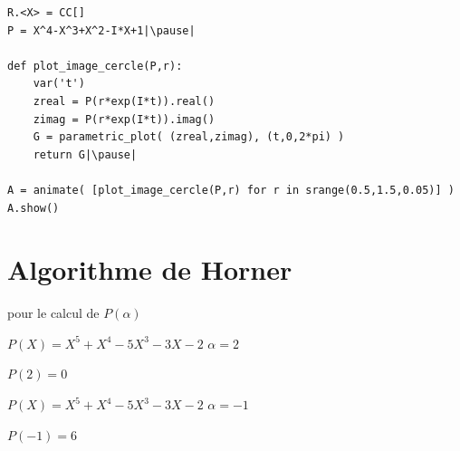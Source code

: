 \begin{frame}[fragile]

\begin{algo}
\begin{lstlisting}
R.<X> = CC[]
P = X^4-X^3+X^2-I*X+1|\pause|

def plot_image_cercle(P,r):
    var('t')
    zreal = P(r*exp(I*t)).real()
    zimag = P(r*exp(I*t)).imag()
    G = parametric_plot( (zreal,zimag), (t,0,2*pi) ) 
    return G|\pause|
    
A = animate( [plot_image_cercle(P,r) for r in srange(0.5,1.5,0.05)] )
A.show()

\end{lstlisting}
\end{algo}
\end{frame}



\section{Algorithme de Horner}

\begin{frame}

 pour le calcul de $P(\alpha)$

\medskip
\pause

$P(X) = X^5 + X^4 - 5X^3 - 3X - 2$ \qquad $\alpha = 2$
\vspace*{-2ex}
\pause


\pause\pause\pause\pause\pause
\pause\pause\pause\pause\pause
\pause\pause
\vspace*{-2ex}
$P(2)=0$

\pause
\medskip
\medskip

$P(X) = X^5 + X^4 - 5X^3 - 3X - 2$ \qquad $\alpha=-1$
\vspace*{-2ex}

\pause
{}

\pause
\vspace*{-2ex}
$P(-1)=6$
\end{frame}


